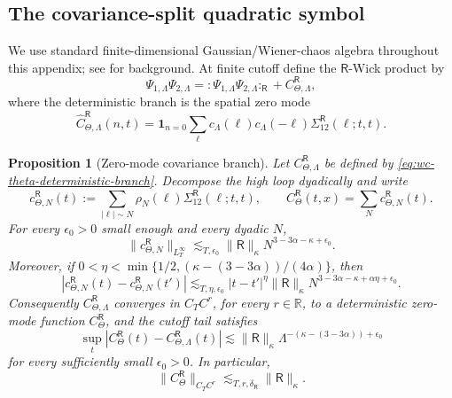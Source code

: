 \documentclass[10pt]{amsart}
\numberwithin{equation}{section}
\theoremstyle{plain}
\newtheorem{proposition}[theorem]{Proposition}
\theoremstyle{definition}
\theoremstyle{remark}
\begin{document}
\subsection{The covariance-split quadratic symbol}
We use standard finite-dimensional Gaussian/Wiener-chaos algebra throughout this appendix; see \cite{Nualart,PeccatiTaqqu} for background.  At finite cutoff define the \(\mathsf R\)-Wick product by
\begin{equation}\label{eq:wc-theta-finite-split}
        \Psi_{1,\Lambda}\Psi_{2,\Lambda}
        =:\Psi_{1,\Lambda}\Psi_{2,\Lambda}:_{\mathsf R}
        +C_{\Theta,\Lambda}^{\mathsf R},
\end{equation}
where the deterministic branch is the spatial zero mode
\begin{equation}\label{eq:wc-theta-deterministic-branch}
        \widehat C_{\Theta,\Lambda}^{\mathsf R}(n,t)
        =\mathbf 1_{n=0}\sum_\ell c_\Lambda(\ell)c_\Lambda(-\ell)
        \Sigma_{12}^{\mathsf R}(\ell;t,t).
\end{equation}

\begin{proposition}[Zero-mode covariance branch]\label{prop:wc-theta-branch}
Let \(C_{\Theta,\Lambda}^{\mathsf R}\) be defined by \eqref{eq:wc-theta-deterministic-branch}.  Decompose the high loop dyadically and write
\begin{equation}
        c_{\Theta,N}^{\mathsf R}(t)
        :=\sum_{|\ell|\sim N}\rho_N(\ell)
        \Sigma_{12}^{\mathsf R}(\ell;t,t),
        \qquad
        C_{\Theta}^{\mathsf R}(t,x)=\sum_N c_{\Theta,N}^{\mathsf R}(t).
\end{equation}
For every \(\epsilon_0>0\) small enough and every dyadic \(N\),
\begin{equation}\label{eq:wc-theta-shell}
        \|c_{\Theta,N}^{\mathsf R}\|_{L_T^\infty}
        \lesssim_{T,\epsilon_0}
        \|\mathsf R\|_\kappa N^{3-3\alpha-\kappa+\epsilon_0}.
\end{equation}
Moreover, if \(0<\eta<\min\{1/2,(\kappa-(3-3\alpha))/(4\alpha)\}\), then
\begin{equation}\label{eq:wc-theta-increment}
        |c_{\Theta,N}^{\mathsf R}(t)-c_{\Theta,N}^{\mathsf R}(t')|
        \lesssim_{T,\eta,\epsilon_0}
        |t-t'|^\eta
        \|\mathsf R\|_\kappa N^{3-3\alpha-\kappa+\alpha\eta+\epsilon_0}.
\end{equation}
Consequently \(C_{\Theta,\Lambda}^{\mathsf R}\) converges in \(C_T C^r\), for every \(r\in\mathbb R\), to a deterministic zero-mode function \(C_\Theta^{\mathsf R}\), and the cutoff tail satisfies
\begin{equation}\label{eq:wc-theta-tail}
        \sup_t|C_{\Theta}^{\mathsf R}(t)-C_{\Theta,\Lambda}^{\mathsf R}(t)|
        \lesssim
        \|\mathsf R\|_\kappa \Lambda^{-(\kappa-(3-3\alpha))+\epsilon_0}
\end{equation}
for every sufficiently small \(\epsilon_0>0\).  In particular,
\begin{equation}\label{eq:wc-theta-branch-bound}
        \|C_{\Theta}^{\mathsf R}\|_{C_T C^r}
        \lesssim_{T,r,\delta_{\mathsf R}}
        \|\mathsf R\|_\kappa.
\end{equation}
\end{proposition}
\end{document}
